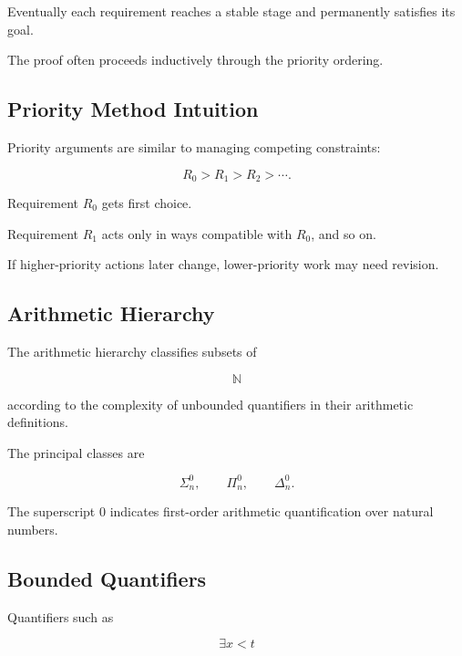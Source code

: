 Eventually each requirement reaches a stable stage and permanently
satisfies its goal.

The proof often proceeds inductively through the priority ordering.

\subsection{Priority Method Intuition}
\label{subsec:priority-method-intuition}

Priority arguments are similar to managing competing constraints:

\[
\boxed{
R_0
>
R_1
>
R_2
>
\cdots.
}
\]

Requirement \(R_0\) gets first choice.

Requirement \(R_1\) acts only in ways compatible with \(R_0\), and so on.

If higher-priority actions later change, lower-priority work may need
revision.

\subsection{Arithmetic Hierarchy}
\label{subsec:recursion-arithmetic-hierarchy}

The arithmetic hierarchy classifies subsets of

\[
\mathbb{N}
\]

according to the complexity of unbounded quantifiers in their arithmetic
definitions.

The principal classes are

\[
\boxed{
\Sigma^0_n,
\qquad
\Pi^0_n,
\qquad
\Delta^0_n.
}
\]

The superscript \(0\) indicates first-order arithmetic quantification over
natural numbers.

\subsection{Bounded Quantifiers}
\label{subsec:bounded-quantifiers-arithmetic-hierarchy}

Quantifiers such as

\[
\boxed{
\exists x<t
}
\]

